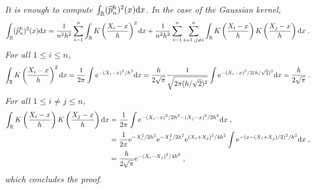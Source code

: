 \vspace{.2cm}

{\em
It is enough to compute $\int_{\mathbb{R}} (\widehat{p}^h_{n})^2(x)\mathrm{d} x$. In the case of the Gaussian kernel,
$$
\int_{\mathbb{R}} (\widehat{p}^h_{n})^2(x)\mathrm{d} x =\frac{1}{n^2h^2}\sum_{i=1}^{n}\int_{\mathbb{R}} K\left(\frac{X_i-x}{h}\right)^2\mathrm{d} x + \frac{1}{n^2h^2}\sum_{i=1}^{n}\sum_{i=1\,;j\neq i}^{n}\int_{\mathbb{R}} K\left(\frac{X_i-x}{h}\right) K\left(\frac{X_j-x}{h}\right)\mathrm{d} x\;.
$$
For all $1\leqslant i \leqslant n$,
$$
\int_{\mathbb{R}} K\left(\frac{X_i-x}{h}\right)^2\mathrm{d} x = \frac{1}{2\pi}\int \mathrm{e}^{-(X_i-x)^2/h^2}\mathrm{d} x = \frac{h}{2\sqrt{\pi}}\frac{1}{\sqrt{2\pi(h/\sqrt{2})^2}}\int \mathrm{e}^{-(X_i-x)^2/2(h/\sqrt{2})^2}\mathrm{d} x = \frac{h}{2\sqrt{\pi}}\;.
$$ 
For all $1\leqslant i\neq j \leqslant n$,
\begin{align*}
\int_{\mathbb{R}} K\left(\frac{X_i-x}{h}\right) K\left(\frac{X_j-x}{h}\right)\mathrm{d} x &= \frac{1}{2\pi}\int \mathrm{e}^{-(X_i-x)^2/2h^2-(X_j-x)^2/2h^2}\mathrm{d} x\;,\\
&=\frac{1}{2\pi}\mathrm{e}^{-X_i^2/2h^2}\mathrm{e}^{-X_j^2/2h^2}\mathrm{e}^{(X_i+X_j)^2/4h^2}\int \mathrm{e}^{-(x - (X_i+X_j)/2)^2/h^2}\mathrm{d} x\;,\\
&= \frac{h}{2\sqrt{\pi}}\mathrm{e}^{-(X_i-X_j)^2/4h^2}\;,
\end{align*}
which concludes the proof.
}

